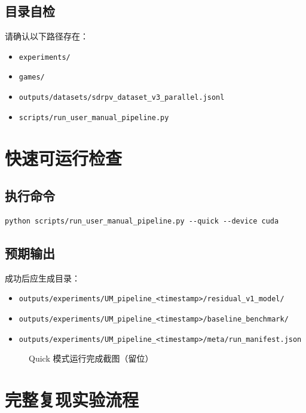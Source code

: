 \subsection{目录自检}
请确认以下路径存在：
\begin{itemize}
    \item \texttt{experiments/}
    \item \texttt{games/}
    \item \texttt{outputs/datasets/sdrpv\_dataset\_v3\_parallel.jsonl}
    \item \texttt{scripts/run\_user\_manual\_pipeline.py}
\end{itemize}

\section{快速可运行检查}

\subsection{执行命令}
\begin{verbatim}
python scripts/run_user_manual_pipeline.py --quick --device cuda
\end{verbatim}

\subsection{预期输出}
成功后应生成目录：
\begin{itemize}
    \item \texttt{outputs/experiments/UM\_pipeline\_<timestamp>/residual\_v1\_model/}
    \item \texttt{outputs/experiments/UM\_pipeline\_<timestamp>/baseline\_benchmark/}
    \item \texttt{outputs/experiments/UM\_pipeline\_<timestamp>/meta/run\_manifest.json}
\end{itemize}

\begin{figure}[htbp]
    \centering
    \caption{Quick 模式运行完成截图（留位）}
    \label{fig:um_quick_placeholder}
\end{figure}

\section{完整复现实验流程}

